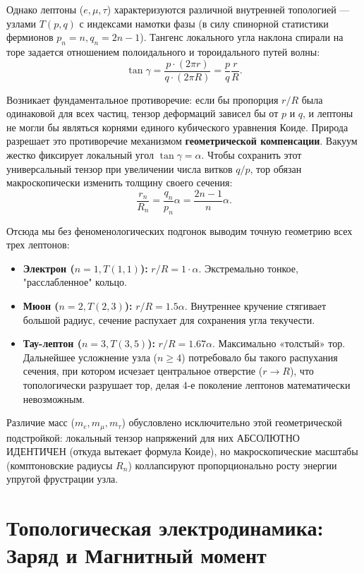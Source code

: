 \documentclass[11pt,a4paper]{article}
\begin{document}
Однако лептоны ($e, \mu, \tau$) характеризуются различной внутренней топологией — узлами $T(p,q)$ с индексами намотки фазы (в силу спинорной статистики фермионов $p_n=n, q_n=2n-1$).
Тангенс локального угла наклона спирали на торе задается отношением полоидального и тороидального путей волны:
\begin{equation}
	\tan \gamma = \frac{p \cdot (2\pi r)}{q \cdot (2\pi R)} = \frac{p}{q} \frac{r}{R}.
\end{equation}

Возникает фундаментальное противоречие: если бы пропорция $r/R$ была одинаковой для всех частиц, тензор деформаций зависел бы от $p$ и $q$, и лептоны не могли бы являться корнями единого кубического уравнения Коиде. 
Природа разрешает это противоречие механизмом \textbf{геометрической компенсации}. Вакуум жестко фиксирует локальный угол $\tan \gamma = \alpha$. Чтобы сохранить этот универсальный тензор при увеличении числа витков $q/p$, тор обязан макроскопически изменить толщину своего сечения:
\begin{equation}
	\frac{r_n}{R_n} = \frac{q_n}{p_n} \alpha = \frac{2n-1}{n} \alpha.
\end{equation}

Отсюда мы без феноменологических подгонок выводим точную геометрию всех трех лептонов:
\begin{itemize}
	\item \textbf{Электрон ($n=1, T(1,1)$):} $r/R = 1 \cdot \alpha$. Экстремально тонкое, "расслабленное" кольцо.
	\item \textbf{Мюон ($n=2, T(2,3)$):} $r/R = 1.5 \alpha$. Внутреннее кручение стягивает большой радиус, сечение распухает для сохранения угла текучести.
	\item \textbf{Тау-лептон ($n=3, T(3,5)$):} $r/R = 1.67 \alpha$. Максимально «толстый» тор. Дальнейшее усложнение узла ($n \ge 4$) потребовало бы такого распухания сечения, при котором исчезает центральное отверстие ($r \to R$), что топологически разрушает тор, делая 4-е поколение лептонов математически невозможным.
\end{itemize}

Различие масс ($m_e, m_\mu, m_\tau$) обусловлено исключительно этой геометрической подстройкой: локальный тензор напряжений для них АБСОЛЮТНО ИДЕНТИЧЕН (откуда вытекает формула Коиде), но макроскопические масштабы (комптоновские радиусы $R_n$) коллапсируют пропорционально росту энергии упругой фрустрации узла.

\section{Топологическая электродинамика: Заряд и Магнитный момент}
\end{document}

